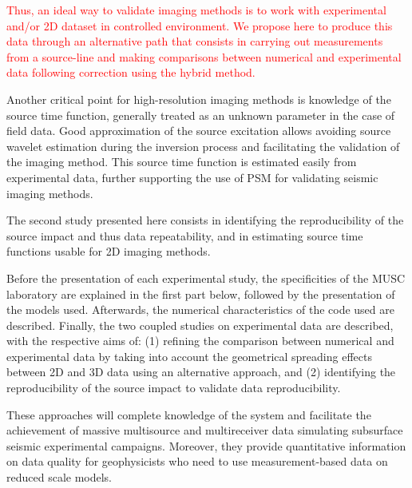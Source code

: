 \documentclass[extra,mreferee]{gji}
\begin{document}
\textcolor{red}{Thus, an ideal way to validate imaging methods is to work with experimental and/or 2D dataset in controlled environment. We propose here to produce this data through an alternative path that consists in carrying out measurements from a source-line and making comparisons between numerical and experimental data following correction using the hybrid method.}

Another critical point for high-resolution imaging methods is knowledge of the source time function, generally treated as an unknown parameter in the case of field data. Good approximation of the source excitation allows avoiding source wavelet estimation during the inversion process and facilitating the validation of the imaging method. This source time function is estimated easily from experimental data, further supporting the use of PSM for validating seismic imaging methods.

The second study presented here consists in identifying the reproducibility of the source impact and thus data repeatability, and in estimating source time functions usable for 2D imaging methods.


Before the presentation of each experimental study, the specificities of the MUSC laboratory are explained in the first part below, followed by the presentation of the models used. Afterwards, the numerical characteristics of the code used are described. Finally, the two coupled studies on experimental data are described, with the respective aims of: (1) refining the comparison between numerical and experimental data by taking into account the geometrical spreading effects between 2D and 3D data using an alternative approach, and (2) identifying the reproducibility of the source impact to validate data reproducibility.

These approaches will complete knowledge of the system and facilitate the achievement of massive multisource and multireceiver data simulating subsurface seismic experimental campaigns. Moreover, they provide quantitative information on data quality for geophysicists who need to use measurement-based data on reduced scale models. 
\end{document}
